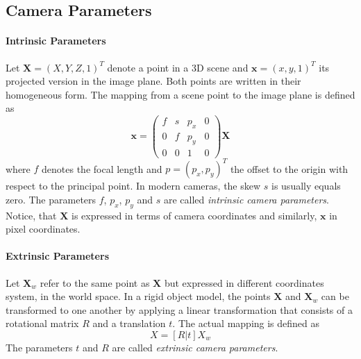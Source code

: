 \subsection{Camera Parameters}
\paragraph{Intrinsic Parameters} Let $\textbf{X} = (X,Y,Z,1)^T$ denote a point in a 3D scene and $\textbf{x} = (x,y,1)^T$ its projected version in the image plane. Both points are written in their homogeneous form. The mapping from a scene point to the image plane is defined as
\begin{equation}
\textbf{x} = 
\begin{pmatrix}
f & s & p_x & 0 \\
0 & f & p_y & 0 \\
0 & 0 & 1 & 0
\end{pmatrix}
\textbf{X}
\end{equation}
where $f$ denotes the focal length and $p = (p_x, p_y)^T$ the offset to the origin with respect to the principal point. In modern cameras, the skew $s$ is usually equals zero. The parameters $f$, $p_x$, $p_y$ and $s$ are called \textit{intrinsic camera parameters}. Notice, that $\textbf{X}$ is expressed in terms of camera coordinates and similarly, $\textbf{x}$ in pixel coordinates.
\paragraph{Extrinsic Parameters} Let $\textbf{X}_w$ refer to the same point as $\textbf{X}$ but expressed in different coordinates system, in the world space. In a rigid object model, the points $\textbf{X}$ and $\textbf{X}_w$ can be transformed to one another by applying a linear transformation that consists of a rotational matrix $R$ and a translation $t$. The actual mapping is defined as
\begin{equation}
	X = \left[ R | t \right] X_w
\end{equation}
The parameters $t$ and $R$ are called \textit{extrinsic camera parameters}.
